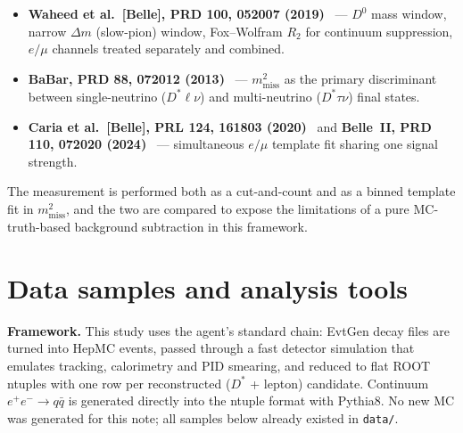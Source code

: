 \documentclass[11pt]{article}
\newcommand{\mmiss}{m^2_{\mathrm{miss}}}
\begin{document}
\begin{itemize}
\item \textbf{Waheed et al.\ [Belle], PRD 100, 052007
  (2019)}~\cite{Waheed:2019} --- $D^0$ mass window, narrow $\Delta m$
  (slow-pion) window, Fox--Wolfram $R_2$ for continuum suppression,
  $e/\mu$ channels treated separately and combined.
\item \textbf{BaBar, PRD 88, 072012 (2013)}~\cite{BaBar:2013} ---
  $\mmiss$ as the primary discriminant between single-neutrino
  ($D^{*}\ell\nu$) and multi-neutrino ($D^{*}\tau\nu$) final states.
\item \textbf{Caria et al.\ [Belle], PRL 124, 161803
  (2020)}~\cite{Caria:2020} and \textbf{Belle~II, PRD 110, 072020
  (2024)}~\cite{BelleII:2024} --- simultaneous $e/\mu$ template fit
  sharing one signal strength.
\end{itemize}

The measurement is performed both as a cut-and-count and as a binned
template fit in $\mmiss$, and the two are compared to expose the
limitations of a pure MC-truth-based background subtraction in this
framework.

\section{Data samples and analysis tools}

\textbf{Framework.} This study uses the agent's standard chain: EvtGen
decay files are turned into HepMC events, passed through a fast detector
simulation that emulates tracking, calorimetry and PID smearing, and
reduced to flat ROOT ntuples with one row per reconstructed
($D^{*}$ + lepton) candidate. Continuum $e^+e^-\to q\bar q$ is generated
directly into the ntuple format with Pythia8. No new MC was generated for
this note; all samples below already existed in \texttt{data/}.
\end{document}
